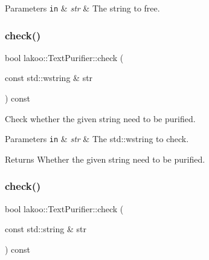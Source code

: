 \begin{DoxyParams}[1]{Parameters}
\mbox{\tt in}  & {\em str} & The string to free. \\
\hline
\end{DoxyParams}
\mbox{\label{classlakoo_1_1_text_purifier_a243df60bae7d8d98a289dbe5c0f85e89}} 
\subsubsection{\texorpdfstring{check()}{check()}\hspace{0.1cm}{\footnotesize\ttfamily [1/4]}}
{\footnotesize\ttfamily bool lakoo\+::\+Text\+Purifier\+::check (\begin{DoxyParamCaption}\item[{const std\+::wstring \&}]{str }\end{DoxyParamCaption}) const}



Check whether the given string need to be purified. 


\begin{DoxyParams}[1]{Parameters}
\mbox{\tt in}  & {\em str} & The std\+::wstring to check. \\
\hline
\end{DoxyParams}
\begin{DoxyReturn}{Returns}
Whether the given string need to be purified. 
\end{DoxyReturn}
\mbox{\label{classlakoo_1_1_text_purifier_a7448ae6b4505878099d20e18ad410189}} 
\subsubsection{\texorpdfstring{check()}{check()}\hspace{0.1cm}{\footnotesize\ttfamily [2/4]}}
{\footnotesize\ttfamily bool lakoo\+::\+Text\+Purifier\+::check (\begin{DoxyParamCaption}\item[{const std\+::string \&}]{str }\end{DoxyParamCaption}) const}

